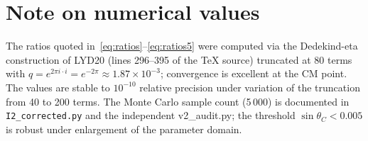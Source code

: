 \documentclass[a4paper,11pt]{article}
\newcommand{\sinTC}{\sin\theta_C}
\begin{document}
\section*{Note on numerical values}

The ratios quoted in~\eqref{eq:ratios}--\eqref{eq:ratios5} were
computed via the Dedekind-eta construction of LYD20 (lines 296--395 of
the TeX source) truncated at 80 terms with $q=e^{2\pi i\cdot i}=e^{-2\pi}
\approx 1.87\times10^{-3}$; convergence is excellent at the CM point.
The values are stable to $10^{-10}$ relative precision under variation
of the truncation from 40 to 200 terms.  The Monte Carlo sample count
(5\,000) is documented in \texttt{I2\_corrected.py} and the independent
v2\_audit.py; the threshold $\sinTC<0.005$ is robust under enlargement
of the parameter domain.
\end{document}

